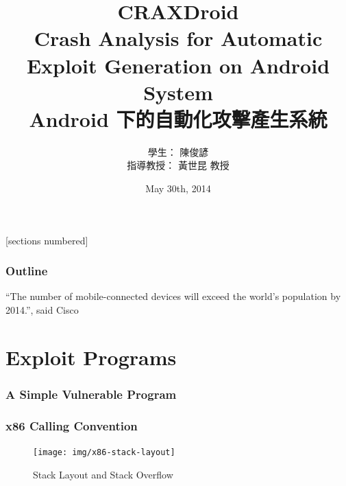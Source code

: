 \documentclass[t,xcolor=table,usenames,dvipsnames]{beamer}
\begin{document}
\title[CRAXDroid: Crash Analysis for Automatic Exploit Generation on Android System ]
        {CRAXDroid\\Crash Analysis for Automatic Exploit Generation on Android System \\[0.3cm]
        Android 下的自動化攻擊產生系統}
        \author[Chun-Yen Chen]{ 學生： 陳俊諺 \\[0.3cm] 指導教授： 黃世昆 教授}
\date[May 30th, 2014]{May 30th, 2014}%


\newcommand{\stwoe}{S\textsuperscript{2}E}


\begin{frame}
    \titlepage
\end{frame}


\setcounter{tocdepth}{1}
[sections numbered]

\begin{frame}
\frametitle{Outline}
        \tableofcontents%
\end{frame}


\begin{frame}
``The number of mobile-connected devices will exceed the world's population by
2014.'', said Cisco
\end{frame}

\section{Exploit Programs}
\begin{frame}
    \sectionpage
\end{frame}

\begin{frame}
    \frametitle{A Simple Vulnerable Program}
    
\end{frame}

\begin{frame}
    \frametitle{x86 Calling Convention}
    \begin{figure}
    \texttt{[image: img/x86-stack-layout]}
    \caption{Stack Layout and Stack Overflow}
    \end{figure}
\end{frame}
\end{document}
